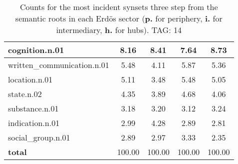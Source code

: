\begin{table}[h!]
\begin{center}
\begin{tabular}{| l || c | c | c | c |}
cognition.n.01 & 8.16  & 8.41  & 7.64  & 8.73 \\\hline
written\_communication.n.01 & 5.48  & 4.11  & 5.87  & 5.36 \\\hline
location.n.01 & 5.11  & 3.48  & 5.48  & 5.05 \\\hline
state.n.02 & 4.35  & 3.89  & 4.68  & 4.06 \\\hline
substance.n.01 & 3.18  & 3.20  & 3.12  & 3.24 \\\hline
indication.n.01 & 2.99  & 4.28  & 2.89  & 2.81 \\\hline
social\_group.n.01 & 2.89  & 2.97  & 3.33  & 2.35 \\\hline\hline
{{\bf total}} & 100.00  & 100.00  & 100.00  & 100.00 \\\hline
\end{tabular}
\caption{Counts for the most incident synsets three step from the semantic roots in each Erd\"os sector ({\bf p.} for periphery, {\bf i.} for intermediary, {\bf h.} for hubs). TAG: 14}
\end{center}
\end{table}